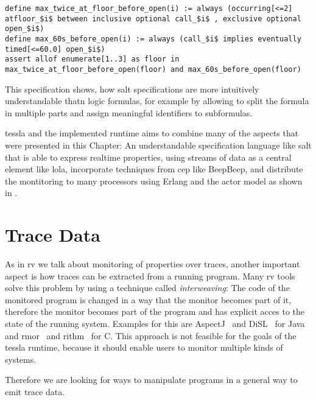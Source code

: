 \begin{lstlisting}[float,breaklines=true,label=listing:salt_example,caption={[Example \gls{salt} specification with realtime operators]An example specification in the \gls{salt} language taken from \cite{Bauer2006} defining behaviour of an elevator.}]
define max_twice_at_floor_before_open(i) := always (occurring[<=2] atfloor_$i$ between inclusive optional call_$i$ , exclusive optional open_$i$)
define max_60s_before_open(i) := always (call_$i$ implies eventually timed[<=60.0] open_$i$)
assert allof enumerate[1..3] as floor in max_twice_at_floor_before_open(floor) and max_60s_before_open(floor)
\end{lstlisting}

This specification shows, how \gls{salt} specifications are more intuitively understandable thatn logic formulas, for example by allowing to split the formula in multiple parts and assign meaningful identifiers to subformulas.

\Gls{tessla} and the implemented runtime aims to combine many of the aspects that were presented in this Chapter: An understandable specification language like \gls{salt} that is able to express realtime properties, using streams of data as a central element like \gls{lola}, incorporate techniques from \gls{cep} like BeepBeep, and distribute the montitoring to many processors using Erlang and the actor model as shown in \cite{Attard2016}.

\section{Trace Data}
\label{sec:related:traces}

As in \gls{rv} we talk about monitoring of properties over traces, another important aspect is how traces can be extracted from a running program.
Many \gls{rv} tools solve this problem by using a technique called \emph{interweaving}: The code of the monitored program is changed in a way that the monitor becomes part of it, therefore the monitor becomes part of the program and has explicit acces to the state of the running system.
Examples for this are AspectJ~\cite{Kiczales2001} and DiSL~\cite{Marek2012} for Java and \gls{rmor}~\cite{Havelund2008} and \gls{rithm}~\cite{Navabpour2013} for C.
This approach is not feasible for the goals of the \gls{tessla} runtime, because it should enable users to monitor multiple kinds of systems.

Therefore we are looking for ways to manipulate programs in a general way to emit trace data.

